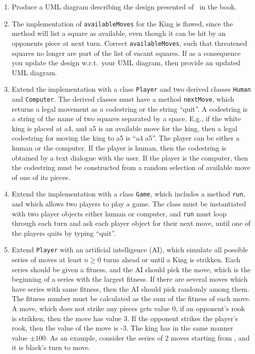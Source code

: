 \begin{enumerate}
\item Produce a UML diagram describing the design presented of \chess\ in the book.
\item The implementation of \lstinline{availableMoves} for the King is flawed, since the method will list a square as available, even though it can be hit by an opponents piece at next turn. Correct \lstinline{availableMoves}, such that threatened squares no longer are part of the list of vacant squares. If as a consequence you update the design w.r.t.\ your UML diagram, then provide an updated UML diagram.
\item Extend the implementation with a class \lstinline{Player} and two derived classes \lstinline{Human} and \lstinline{Computer}. The derived classes must have a method \lstinline{nextMove}, which returns a legal movement as a codestring or the string ``quit''.  A codestring is a string of the name of two squares separated by a space. E.g., if the white king is placed at a4, and a5 is an available move for the king, then a legal codestring for moving the king to a5 is ``a4 a5''. The player can be either a human or the computer. If the player is human, then the codestring is obtained by a text dialogue with the user. If the player is the computer, then the codestring must be constructed from a random selection of available move of one of its pieces.
\item Extend the implementation with a class \lstinline{Game}, which includes a method \lstinline{run}, and which allows two players to play a game. The class must be instantiated with two player objects either human or computer, and \lstinline{run} must loop through each turn and ask each player object for their next move, until one of the players quits by typing ``quit''.
\item Extend \lstinline{Player} with an artificial intelligence (AI), which simulate all possible series of moves at least $n \geq 0$ turns ahead or until a King is strikken. Each series should be given a fitness, and the AI should pick the move, which is the beginning of a series with the largest fitness. If there are several moves which have series with same fitness, then the AI should pick randomly among them. The fitness number must be calculated as the sum of the fitness of each move. A move, which does not strike any pieces gets value 0, if an opponent's rook is strikken, then the move has value 3. If the opponent strikes the player's rook, then the value of the move is -3. The king has in the same manner value $\pm100$. As an example, consider the series of 2 moves starting from , and it is black's turn to move.

\end{enumerate}
